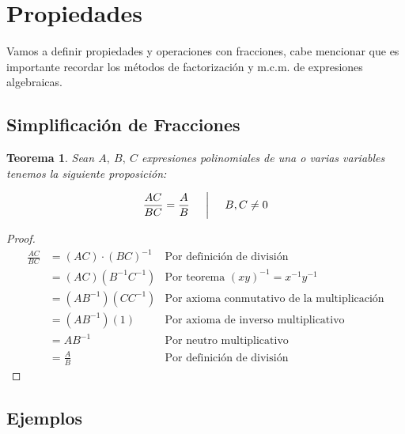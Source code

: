 \documentclass[letterpaper, 10pt, oneside]{book}
\newtheorem{theorem}{Teorema}[section]
\begin{document}
	\section{Propiedades}
	Vamos a definir propiedades y operaciones con fracciones, cabe mencionar que es importante recordar los métodos de factorización y m.c.m. de expresiones algebraicas. 
	
	\subsection{Simplificación de Fracciones}
	\vspace{5mm}
	
	\begin{theorem}
		Sean $A, \ B, \ C$ expresiones polinomiales de una o varias variables tenemos la siguiente proposición: 
		
		$$\frac{AC}{BC} = \frac{A}{B} \hspace{5mm} \bigg| \hspace{5mm} B, C \neq 0$$
		
	\end{theorem}
	
	\vspace{5mm}
	
	\begin{proof}
		\begin{align*}
			\frac{AC}{BC} &= (AC)\cdot(BC)^{-1} & \text{Por definición de división}\\
						  &=(AC)(B^{-1}C^{-1}) & \text{Por teorema $(xy)^{-1} = x^{-1}y^{-1}$}\\
						  &=(AB^{-1})(CC^{-1}) & \text{Por axioma conmutativo de la multiplicación}\\
						  &=(AB^{-1})(1) & \text{Por axioma de inverso multiplicativo}\\
						  &=AB^{-1} & \text{Por neutro multiplicativo}\\
						  &=\frac{A}{B} & \text{Por definición de división}
		\end{align*}
	\end{proof}
	
	\subsection*{Ejemplos}
	
\end{document}
